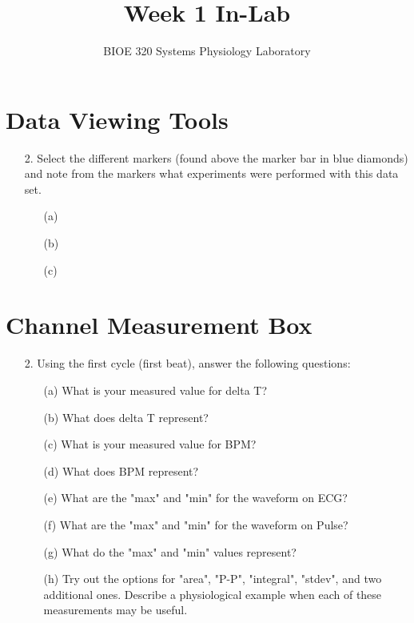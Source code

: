 \documentclass{article}
\title{Week 1 In-Lab}
\author{BIOE 320 Systems Physiology Laboratory}
\date{}
\begin{document}
\maketitle
\large

\section*{Data Viewing Tools}
\begin{itemize}
	\item[2.] Select the different markers (found above the marker bar in blue diamonds) and note from the markers what experiments were performed with this data set.
	
		\begin{itemize}
			\item[(a)]
			
			\item[(b)]\vspace{1cm}
			
			\item[(c)]\vspace{1cm}
		\end{itemize}

\end{itemize}

\section*{Channel Measurement Box}
\begin{itemize}		
	\item[2.] Using the first cycle (first beat), answer the following questions:
		\begin{itemize}
			\item[(a)] What is your measured value for delta T?\vspace{1cm}
			\item[(b)] What does delta T represent?\vspace{1cm}
			\item[(c)] What is your measured value for BPM?\vspace{1cm}
			\item[(d)] What does BPM represent?\vspace{1cm}
			\item[(e)] What are the "max" and "min" for the waveform on ECG?\vspace{1cm}
			\item[(f)] What are the "max" and "min" for the waveform on Pulse?\vspace{1cm}
			\item[(g)] What do the "max" and "min" values represent?\vspace{2cm}
			\item[(h)] Try out the options for "area", "P-P", "integral", "stdev", and two additional ones. Describe a physiological example when each of these measurements may be useful.\vspace{9cm}
		\end{itemize}
\end{itemize}
\end{document}
